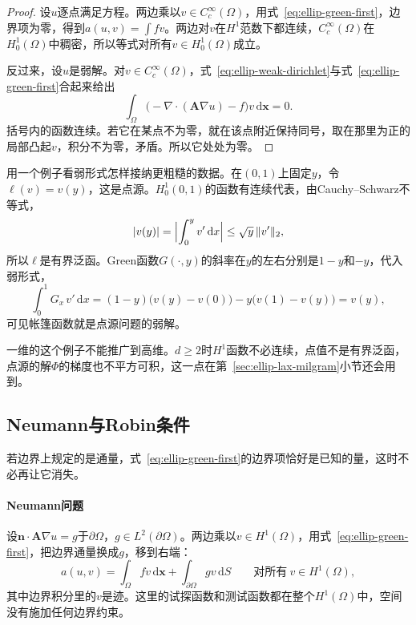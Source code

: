 \begin{proof}
设$u$逐点满足方程。两边乘以$v\in C_c^\infty(\Omega)$，用式~\eqref{eq:ellip-green-first}，边界项为零，得到$a(u,v)=\int fv$。两边对$v$在$H^1$范数下都连续，$C_c^\infty(\Omega)$在$H^1_0(\Omega)$中稠密，所以等式对所有$v\in H^1_0(\Omega)$成立。

反过来，设$u$是弱解。对$v\in C_c^\infty(\Omega)$，式~\eqref{eq:ellip-weak-dirichlet}与式~\eqref{eq:ellip-green-first}合起来给出
\[
 \int_\Omega\bigl(-\nabla\cdot(\bm{A}\nabla u)-f\bigr)v\,\mathrm{d}\bm{x}=0 .
\]
括号内的函数连续。若它在某点不为零，就在该点附近保持同号，取在那里为正的局部凸起$v$，积分不为零，矛盾。所以它处处为零。
\end{proof}

用一个例子看弱形式怎样接纳更粗糙的数据。在$(0,1)$上固定$y$，令$\ell(v)=v(y)$，这是点源。$H^1_0(0,1)$的函数有连续代表，由Cauchy--Schwarz不等式，
\[
 \lvert v(y)\rvert=\Bigl\lvert\int_0^yv'\,\mathrm{d}x\Bigr\rvert\leq\sqrt y\,\lVert v'\rVert_2 ,
\]
所以$\ell$是有界泛函。Green函数$G(\cdot,y)$的斜率在$y$的左右分别是$1-y$和$-y$，代入弱形式，
\[
 \int_0^1G_x\,v'\,\mathrm{d}x=(1-y)\bigl(v(y)-v(0)\bigr)-y\bigl(v(1)-v(y)\bigr)=v(y),
\]
可见帐篷函数就是点源问题的弱解。

一维的这个例子不能推广到高维。$d\geq2$时$H^1$函数不必连续，点值不是有界泛函，点源的解$\Phi$的梯度也不平方可积，这一点在第~\ref{sec:ellip-lax-milgram}小节还会用到。

\subsection{Neumann与Robin条件}
\label{sec:ellip-weak-neumann}

若边界上规定的是通量，式~\eqref{eq:ellip-green-first}的边界项恰好是已知的量，这时不必再让它消失。

\paragraph{Neumann问题}
设$\bm{n}\cdot\bm{A}\nabla u=g$于$\partial\Omega$，$g\in L^2(\partial\Omega)$。两边乘以$v\in H^1(\Omega)$，用式~\eqref{eq:ellip-green-first}，把边界通量换成$g$，移到右端：
\begin{equation}
 a(u,v)=\int_\Omega fv\,\mathrm{d}\bm{x}+\int_{\partial\Omega}gv\,\mathrm{d}S\qquad\text{对所有}\ v\in H^1(\Omega),
 \label{eq:ellip-weak-neumann}
\end{equation}
其中边界积分里的$v$是迹。这里的试探函数和测试函数都在整个$H^1(\Omega)$中，空间没有施加任何边界约束。

